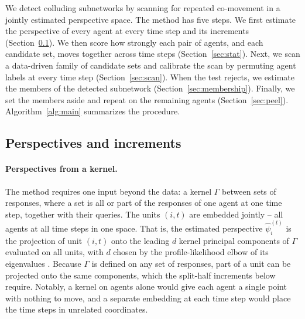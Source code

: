 \documentclass{article}
\theoremstyle{plain}
\theoremstyle{definition}
\begin{document}
We detect colluding subnetworks by scanning for repeated co-movement in a jointly estimated perspective space. The method has five steps. We first estimate the perspective of every agent at every time step and its increments (Section~\ref{sec:est-ps}). We then score how strongly each pair of agents, and each candidate set, moves together across time steps (Section~\ref{sec:stat}). Next, we scan a data-driven family of candidate sets and calibrate the scan by permuting agent labels at every time step (Section~\ref{sec:scan}). When the test rejects, we estimate the members of the detected subnetwork (Section~\ref{sec:membership}). Finally, we set the members aside and repeat on the remaining agents (Section~\ref{sec:peel}). Algorithm~\ref{alg:main} summarizes the procedure.

\subsection{Perspectives and increments}
\label{sec:est-ps}

\paragraph{Perspectives from a kernel.} The method requires one input beyond the data: a kernel $\Gamma$ between sets of responses, where a set is all or part of the responses of one agent at one time step, together with their queries. The units $(i,t)$ are embedded jointly -- all agents at all time steps in one space. That is, the estimated perspective $\hat\psi_i^{(t)}$ is the projection of unit $(i,t)$ onto the leading $d$ kernel principal components of $\Gamma$ evaluated on all units, with $d$ chosen by the profile-likelihood elbow of its eigenvalues \citep{zhu2006automatic}. Because $\Gamma$ is defined on any set of responses, part of a unit can be projected onto the same components, which the split-half increments below require. Notably, a kernel on agents alone would give each agent a single point with nothing to move, and a separate embedding at each time step would place the time steps in unrelated coordinates.
\end{document}
